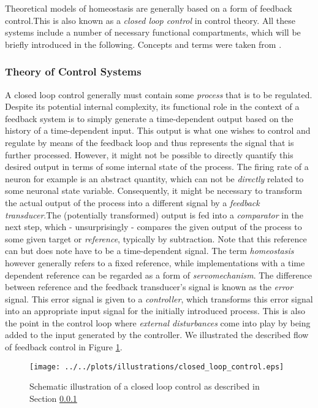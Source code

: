\documentclass[10pt,a4paper]{article}
\begin{document}
Theoretical models of homeostasis are generally based on a form of feedback control.This is also known as a \textit{closed loop control} in control theory. All these systems include a number of necessary functional compartments, which will be briefly introduced in the following. Concepts and terms were taken from \cite[p. 59-64]{Cybernetik_Systems_Cruse_2006}.
\newpage
\subsubsection{Theory of Control Systems} \label{Control_Sys_Theo_Section}
A closed loop control generally must contain some \emph{process} that is to be regulated. Despite its potential internal complexity, its functional role in the context of a feedback system is to simply generate a time-dependent output based on the history of a time-dependent input. This output is what one wishes to control and regulate by means of the feedback loop and thus represents the signal that is further processed. However, it might not be possible to directly quantify this desired output in terms of some internal state of the process. The firing rate of a neuron for example is an abstract quantity, which can not be \emph{directly} related to some neuronal state variable. Consequently, it might be necessary to transform the actual output of the process into a different signal by a \textit{feedback transducer}.The (potentially transformed) output is fed into a \textit{comparator} in the next step, which - unsurprisingly - compares the given output of the process to some given target or \textit{reference}, typically by subtraction. Note that this reference can but does note have to be a time-dependent signal. The term \textit{homeostasis} however generally refers to a fixed reference, while implementations with a time dependent reference can be regarded as a form of \textit{servomechanism}. The difference between reference and the feedback transducer's signal is known as the \textit{error} signal. This error signal is given to a \textit{controller}, which transforms this error signal into an appropriate input signal for the initially introduced process. This is also the point in the control loop where \textit{external disturbances} come into play by being added to the input generated by the controller. We illustrated the described flow of feedback control in Figure \ref{Closed_Loop_Control_Illustration}.
\begin{figure}
\begin{center}
\texttt{[image: ../../plots/illustrations/closed\_loop\_control.eps]}
\end{center}
\caption{Schematic illustration of a closed loop control as described in Section \ref{Control_Sys_Theo_Section}}
\label{Closed_Loop_Control_Illustration}
\end{figure}
\end{document}
